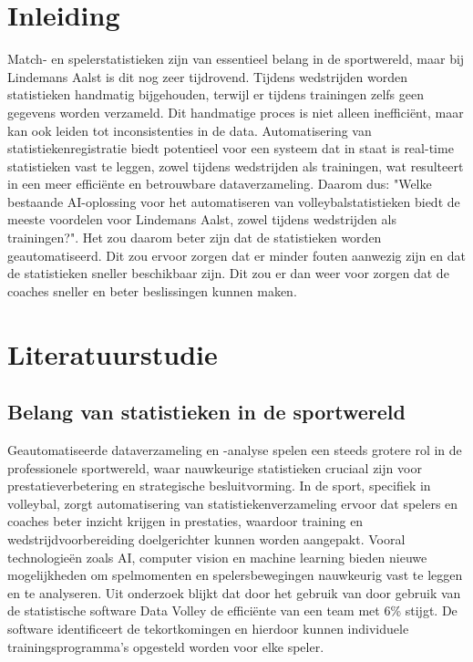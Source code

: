 
\section{Inleiding}%
\label{sec:inleiding}

Match- en spelerstatistieken zijn van essentieel belang in de sportwereld, maar bij Lindemans Aalst is dit nog zeer tijdrovend. Tijdens wedstrijden worden statistieken handmatig bijgehouden, terwijl er tijdens trainingen zelfs geen gegevens worden verzameld. Dit handmatige proces is niet alleen inefficiënt, maar kan ook leiden tot inconsistenties in de data. Automatisering van statistiekenregistratie biedt potentieel voor een systeem dat in staat is real-time statistieken vast te leggen, zowel tijdens wedstrijden als trainingen, wat resulteert in een meer efficiënte en betrouwbare dataverzameling. Daarom dus: "Welke bestaande AI-oplossing voor het automatiseren van volleybalstatistieken biedt de meeste voordelen voor Lindemans Aalst, zowel tijdens wedstrijden als trainingen?". Het zou daarom beter zijn dat de statistieken worden geautomatiseerd. Dit zou ervoor zorgen dat er minder fouten aanwezig zijn en dat de statistieken sneller beschikbaar zijn. Dit zou er dan weer voor zorgen dat de coaches sneller en beter beslissingen kunnen maken.


\section{Literatuurstudie}%
\label{sec:literatuurstudie}
\subsection{Belang van statistieken in de sportwereld}
Geautomatiseerde dataverzameling en -analyse spelen een steeds grotere rol in de professionele sportwereld, waar nauwkeurige statistieken cruciaal zijn voor prestatieverbetering en strategische besluitvorming. In de sport, specifiek in volleybal, zorgt automatisering van statistiekenverzameling ervoor dat spelers en coaches beter inzicht krijgen in prestaties, waardoor training en wedstrijdvoorbereiding doelgerichter kunnen worden aangepakt. Vooral technologieën zoals AI, computer vision en machine learning bieden nieuwe mogelijkheden om spelmomenten en spelersbewegingen nauwkeurig vast te leggen en te analyseren. Uit onderzoek \autocite{Harabagiu2023} blijkt dat door het gebruik van door gebruik van de statistische software Data Volley de efficiënte van een team met 6\% stijgt. De software identificeert de tekortkomingen en hierdoor kunnen individuele trainingsprogramma's opgesteld worden voor elke speler.

